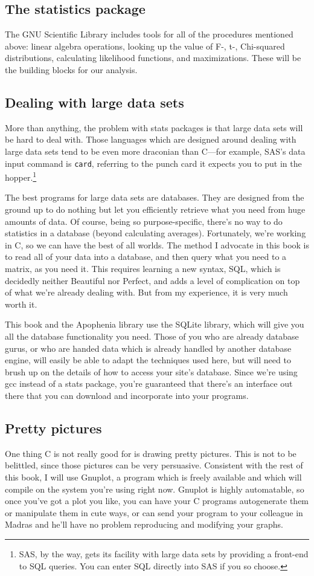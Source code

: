 \documentclass[12pt,notitlepage, openany]{book}
\begin{document}
\subsection{The statistics package} The GNU Scientific Library includes tools for
all of the procedures mentioned above: linear algebra operations, looking up the
value of F-, t-, Chi-squared distributions, calculating likelihood functions, and
maximizations. These will be the building blocks for our analysis.

\subsection{Dealing with large data sets} More than anything, the problem
with stats packages is that large data sets will be hard to deal
with. Those languages which are designed around dealing with large data
sets tend to be even more draconian than C---for example, SAS's data
input command is {\tt card}, referring to the punch card it expects you
to put in the hopper.\footnote{SAS, by the way, gets its facility with large data sets
by providing a front-end to SQL queries. You can enter SQL directly into
SAS if you so choose.}

The best programs for large data sets are databases. They are designed
from the ground up to do nothing but let you efficiently retrieve what you
need from huge amounts of data.  Of course, being so purpose-specific,
there's no way to do statistics in a database (beyond calculating
averages). Fortunately, we're working in C, so we can have the best of
all worlds. The method I advocate in this book is to read all of your
data into a database, and then query what you need to a matrix, as you
need it. This requires learning a new syntax, SQL, which is decidedly
neither Beautiful nor Perfect, and adds a level of complication on top
of what we're already dealing with. But from my experience, it is very
much worth it.

This book and the Apophenia library use the SQLite library, which will
give you all the database functionality you need. Those of you who are
already database gurus, or who are handed data which is already handled
by another database engine, will easily be able to adapt the techniques
used here, but will need to brush up on the details of how to access
your site's database. Since we're using gcc instead of a stats package,
you're guaranteed that there's an interface out there that you can
download and incorporate into your programs.

\subsection{Pretty pictures} One thing C is not really good for is drawing
pretty pictures. This is not to be belittled, since those pictures
can be very persuasive. Consistent with the rest of this book, I will use
Gnuplot, a program which is freely available and which will compile on
the system you're using right now. Gnuplot is highly automatable, so once
you've got a plot you like, you can have your C programs autogenerate
them or manipulate them in cute ways, or can send your program to your
colleague in Madras and he'll have no problem reproducing and modifying
your graphs.
\end{document}

